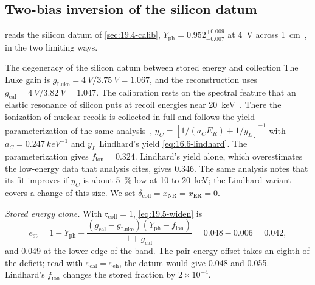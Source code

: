 \subsection{Two-bias inversion of the silicon datum}\label{sec:19.5-inversion}

 reads the silicon datum of \cref{sec:19.4-calib}, $Y_{\mathrm{ph}} = 0.952^{+0.009}_{-0.007}$ at \SI{4}{V} across \SI{1}{cm}~\cite[Sects.~2, 4]{agnese2018nuclear}, in the two limiting ways.

\begin{workedexample}{The degeneracy of the silicon datum between stored energy and collection}\label{we:19-degeneracy}
The Luke gain is $g_{\mathrm{Luke}} = \SI{4}{V}/\SI{3.75}{V} = 1.067$, and the reconstruction uses $g_{\mathrm{cal}} = \SI{4}{V}/\SI{3.82}{V} = 1.047$. The calibration rests on the spectral feature that an elastic resonance of silicon puts at recoil energies near \SI{20}{keV}~\cite[Sect.~3.2]{agnese2018nuclear}. There the ionization of nuclear recoils is collected in full and follows the yield parameterization of the same analysis~\cite[Eq.~(4), Sect.~4]{agnese2018nuclear}, $y_C = [1/(a_CE_R) + 1/y_L]^{-1}$ with $a_C = \SI{0.247}{keV^{-1}}$ and $y_L$ Lindhard's yield \cref{eq:16.6-lindhard}. The parameterization gives $f_{\mathrm{ion}} = 0.324$. Lindhard's yield alone, which overestimates the low-energy data that analysis cites, gives 0.346. The same analysis notes that its fit improves if $y_C$ is about \SI{5}{\percent} low at 10 to \SI{20}{keV}; the Lindhard variant covers a change of this size. We set $\delta_{\mathrm{coll}} = x_{\mathrm{NR}} = x_{\mathrm{ER}} = 0$.

\emph{Stored energy alone.} With $\mathfrak{r}_{\mathrm{coll}} = 1$, \cref{eq:19.5-widen} is
\begin{equation*}
  e_{\mathrm{st}} = 1 - Y_{\mathrm{ph}} + \frac{(g_{\mathrm{cal}} - g_{\mathrm{Luke}})(Y_{\mathrm{ph}} - f_{\mathrm{ion}})}{1 + g_{\mathrm{cal}}} = 0.048 - 0.006 = 0.042 ,
\end{equation*}
and 0.049 at the lower edge of the band. The pair-energy offset takes an eighth of the deficit; read with $\varepsilon_{\mathrm{cal}} = \varepsilon_{\mathrm{eh}}$, the datum would give 0.048 and 0.055. Lindhard's $f_{\mathrm{ion}}$ changes the stored fraction by $2\times10^{-4}$.


\end{workedexample}
